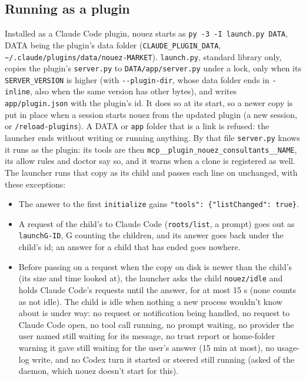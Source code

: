 \documentclass[10pt,a4paper]{article}
\newcommand{\code}[1]{\texttt{#1}}
\begin{document}
\subsection{Running as a plugin}
\label{sec:plugin}

Installed as a Claude Code plugin, nouez starts as \code{py -3 -I launch.py DATA}, DATA being the
plugin's data folder (\code{CLAUDE\_PLUGIN\_DATA}, \code{\textasciitilde/.claude/plugins/data/nouez-MARKET}).
\code{launch.py}, standard library only, copies the plugin's \code{server.py} to
\code{DATA/app/server.py} under a lock, only when its \code{SERVER\_VERSION} is higher (with
\code{-{}-plugin-dir}, whose data folder ends in \code{-inline}, also when the same version has
other bytes), and writes \code{app/plugin.json} with the plugin's id. It does so at its start,
so a newer copy is put in place when a session starts nouez from the updated plugin (a new session,
or \code{/reload-plugins}). A DATA or \code{app} folder that is a link is refused: the launcher
ends without writing or running anything. By that file
\code{server.py} knows it runs as the plugin: its tools are then
\code{mcp\_\_plugin\_nouez\_consultants\_\_NAME}, its allow rules and doctor say so, and it warns
when a clone is registered as well. The launcher runs that copy as its child and passes each line
on unchanged, with these exceptions:
\begin{itemize}
  \item The answer to the first \code{initialize} gains \code{"tools": \{"listChanged": true\}}.
  \item A request of the child's to Claude Code (\code{roots/list}, a prompt) goes out as
    \code{launchG-ID}, G counting the children, and its answer goes back under the child's id;
    an answer for a child that has ended goes nowhere.
  \item Before passing on a request when the copy on disk is newer than the child's (its size and
    time looked at), the launcher asks the child \code{nouez/idle} and holds Claude Code's
    requests until the answer, for at most 15 s (none counts as not idle). The child is idle when
    nothing a new process wouldn't know about is under way: no request or notification being
    handled, no request to Claude Code open, no tool call running, no prompt waiting, no provider
    the user named still waiting for its message, no trust report or home-folder warning it gave
    still waiting for the user's answer (15 min at most), no usage-log write, and no Codex turn it started
    or steered still running (asked of the daemon, which nouez doesn't start for this).
\end{itemize}
\end{document}
